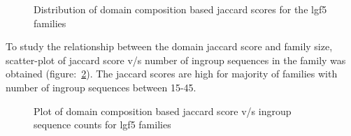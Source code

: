 \documentclass{article}
\begin{document}
		\begin{figure}
			\caption{Distribution of domain composition based jaccard scores for the lgf5 families}
			\label{fig:hist_domain_jaccard_scores_lgf5}
		\end{figure}
		
		To study the relationship between the domain jaccard score and family size, scatter-plot of jaccard score v/s number of ingroup sequences in the family was obtained (figure:~\ref{fig:scatter_domain_jaccard_vs_seq_ct_lgf5}). The jaccard scores are high for majority of families with number of ingroup sequences between 15-45.
		
		\begin{figure}
			\caption{Plot of domain composition based jaccard score v/s ingroup sequence counts for lgf5 families}
			\label{fig:scatter_domain_jaccard_vs_seq_ct_lgf5}
		\end{figure}
		
\end{document}
